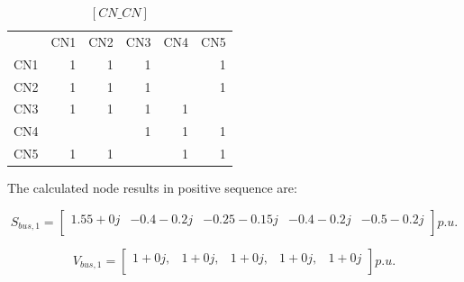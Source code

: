 \documentclass[nols,a4paper,twoside,notoc,fleqn]{tufte-book}
\begin{document}
\begin{table}[h!]
	\begin{tabular}{lrrrrr}
		{} &  CN1 &  CN2 &  CN3 &  CN4 &  CN5 \\
		CN1 &    1 &    1 &    1 &      &    1 \\
		CN2 &    1 &    1 &    1 &      &    1 \\
		CN3 &    1 &    1 &    1 &    1 &      \\
		CN4 &      &      &    1 &    1 &    1 \\
		CN5 &    1 &    1 &      &    1 &    1 \\
	\end{tabular}
\caption{$[CN\_CN]$}
\end{table}





The calculated node results in positive sequence are:
%

$$
S_{bus,1} = \left[ \begin{array}{ccccc}
1.55+0  j & -0.4 -0.2 j & -0.25-0.15j & -0.4 -0.2 j & -0.5 -0.2 j\\
\end{array} \right] p.u.
$$

$$
V_{bus,1} = \left[ \begin{array}{ccccc}
1+0j, & 1+0j,  & 1+0j, & 1+0j,  & 1+0j \\
\end{array} \right] p.u.
$$
\end{document}

